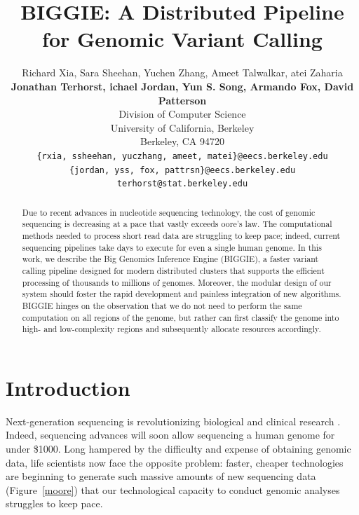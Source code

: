 \documentclass[10pt]{article}
\begin{document}
\title{BIGGIE: A Distributed Pipeline for Genomic Variant Calling}
\author{
Richard Xia, Sara Sheehan, Yuchen Zhang, Ameet Talwalkar, atei Zaharia \\
\textbf{Jonathan Terhorst, ichael Jordan, Yun S. Song, Armando Fox, David Patterson} \\
Division of Computer Science\\
University of California, Berkeley\\
Berkeley, CA 94720 \\
\texttt{\{rxia, ssheehan, yuczhang, ameet, matei\}@eecs.berkeley.edu} \\
\texttt{\{jordan, yss, fox, pattrsn\}@eecs.berkeley.edu} \\
\texttt{terhorst@stat.berkeley.edu}
}
\maketitle

\begin{abstract}
Due to recent advances in nucleotide sequencing technology, the cost of genomic
sequencing is decreasing at a pace that vastly exceeds oore's law.  The
computational methods needed to process short read data are struggling to keep
pace; indeed, current sequencing pipelines take days to execute for even a
single human genome.  In this work, we describe the Big Genomics Inference
Engine (BIGGIE), a faster variant calling pipeline designed for modern
distributed clusters that supports the efficient processing of thousands to
millions of genomes.  Moreover, the modular design of our system should foster
the rapid development and painless integration of new algorithms.  BIGGIE
hinges on the observation that we do not need to perform the same computation
on all regions of the genome, but rather can first classify the genome into
high- and low-complexity regions and subsequently allocate resources
accordingly.
\end{abstract}

\twocolumn

\section{Introduction}

Next-generation sequencing is revolutionizing biological and clinical research
\cite{schuster}.  Indeed, sequencing advances will soon allow sequencing a
human genome for under \$1000. Long hampered by the difficulty and
expense of obtaining genomic data, life scientists now face the opposite
problem: faster, cheaper technologies are beginning to generate such massive
amounts of new sequencing data (Figure~\ref{moore}) that our technological
capacity to conduct genomic analyses struggles to keep pace. 
\end{document}
